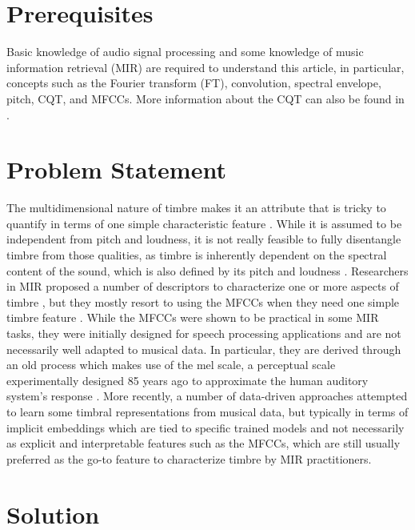 \documentclass[journal]{IEEEtran}
\begin{document}
\section{Prerequisites}

Basic knowledge of audio signal processing and some knowledge of music information retrieval (MIR) \cite{mueller2007} are required to understand this article, in particular, concepts such as the Fourier transform (FT), convolution, spectral envelope, pitch, CQT, and MFCCs. More information about the CQT can also be found in \cite{brown1991, brown1992}.


\section{Problem Statement}

The multidimensional nature of timbre makes it an attribute that is tricky to quantify in terms of one simple characteristic feature \cite{grey1977}. While it is assumed to be independent from pitch and loudness, it is not really feasible to fully disentangle timbre from those qualities, as timbre is inherently dependent on the spectral content of the sound, which is also defined by its pitch and loudness \cite{moore2004}. Researchers in MIR proposed a number of descriptors to characterize one or more aspects of timbre \cite{peeters2011}, but they mostly resort to using the MFCCs when they need one simple timbre feature \cite{mueller2007}. While the MFCCs were shown to be practical in some MIR tasks, they were initially designed for speech processing applications \cite{mermelstein1976} and are not necessarily well adapted to musical data. In particular, they are derived through an old process which makes use of the mel scale, a perceptual scale experimentally designed 85 years ago to approximate the human auditory system's response \cite{stevens1937}. More recently, a number of data-driven approaches attempted to learn some timbral representations from musical data, but typically in terms of implicit embeddings which are tied to specific trained models \cite{engel2017, pons2017, hung2019, luo2019, lee2020} and not necessarily as explicit and interpretable features such as the MFCCs, which are still usually preferred as the go-to feature to characterize timbre by MIR practitioners.


\section{Solution}
\end{document}
